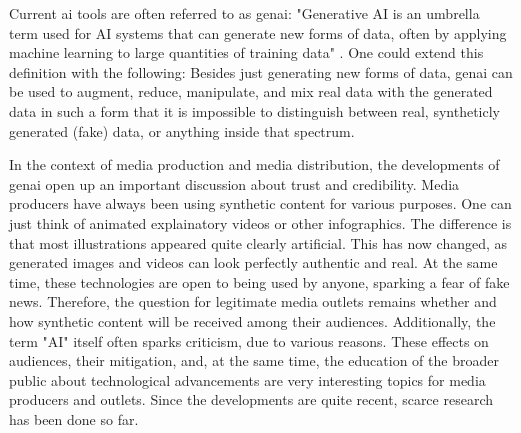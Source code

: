 \documentclass[
  a4paper,  %
  twoside,  %
  bibliography=totoc,
  headsepline,
  cleardoublepage=empty,
  parskip=half,
  draft=false
]{scrbook}
\begin{document}
Current \gls{ai} tools are often referred to as \gls{genai}: "Generative AI is an umbrella term used for AI systems that can generate new forms of data, often by applying machine learning to large quantities of training data" \cite{arguedasAutomatingDemocracyGenerative2023}. One could extend this definition with the following: Besides just generating new forms of data, \gls{genai} can be used to augment, reduce, manipulate, and mix real data with the generated data in such a form that it is impossible to distinguish between real, syntheticly generated (fake) data, or anything inside that spectrum.

In the context of media production and media distribution, the developments of \gls{genai} open up an important discussion about trust and credibility. Media producers have always been using synthetic content for various purposes. One can just think of animated explainatory videos or other infographics. The difference is that most illustrations appeared quite clearly artificial. This has now changed, as generated images and videos can look perfectly authentic and real. At the same time, these technologies are open to being used by anyone, sparking a fear of fake news. Therefore, the question for legitimate media outlets remains whether and how synthetic content will be received among their audiences. Additionally, the term "AI" itself often sparks criticism, due to various reasons. These effects on audiences, their mitigation, and, at the same time, the education of the broader public about technological advancements are very interesting topics for media producers and outlets. Since the developments are quite recent, scarce research has been done so far.
\end{document}
